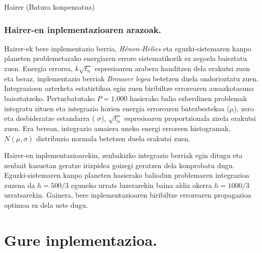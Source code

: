 \begin{algorithm}[h!]
  \caption{Hairer (Batura konpensatua)}
  \label{alg:Hairer-BK}
\end{algorithm} 


\subsubsection*{Hairer-en inplementazioaren arazoak.}

Hairer-ek bere inplementazio berria, \emph{Hénon-Helies} eta eguzki-sistemaren kanpo planeten problemetarako energiaren errore sistematikorik ez zegoela baieztatu zuen. Energia errorea, $k\sqrt{t_n}$ espresioaren arabera handitzen dela erakutsi zuen eta beraz, inplementazio berriak \emph{Brouwer legea} \cite{Grazier2005} betetzen duela ondorioztatu zuen. Integrazioen azterketa estatistikoa egin zuen biribiltze errorearen ausazkotasuna baieztatzeko. Perturbatutako $P=1.000$ hasierako balio ezberdinen problemak integratu zituen eta integrazio horien energia errorearen batezbestekoa ($\mu$), zero eta desbideratze estandarra ( $\sigma$), $\sqrt{t_n}$ espresioaren proportzionala zirela erakutsi zuen. Era berean, integrazio amaiera uneko energi erroreen histogramak, $N(\mu,\sigma)$ distribuzio normala betetzen duela erakutsi zuen.

Hairer-en inplementazioarekin, zenbakizko integrazio berriak egin ditugu eta zenbait kasuetan geratze irizpidea goizegi geratzen dela konprobatu dugu. Eguzki-sistemaren kanpo planeten hasierako baliodun problemaren integrazioa zuzena da $h=500/3$ eguneko urrats luzerarekin baina aldiz okerra $h=1000/3$ urratsarekin.  Gainera, bere inplementazioaren biribiltze errorearen propagazioa optimoa ez dela uste dugu. 


\section{Gure inplementazioa.}

